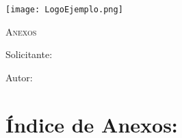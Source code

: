\documentclass[main]{subfiles}
\begin{document}
\newpage
\thispagestyle{empty}
\begin{center}
    \centering
    \texttt{[image: LogoEjemplo.png]} \par
    \vspace{3 cm}
    {\scshape\Huge Anexos \par}
    \vspace{1.5cm}
    {\itshape\Huge \TituloProyecto \par}
    \vfill
    {\Large Solicitante:  \Solicitante \par}
    \vspace{0.5cm}
    {\Large Autor:  \Autor \par}
    \vspace{1.5cm}
    {\Large \Fecha \par}
\end{center}

\chapter*{Índice de Anexos:}
\newpage
{}


%

\end{document}
